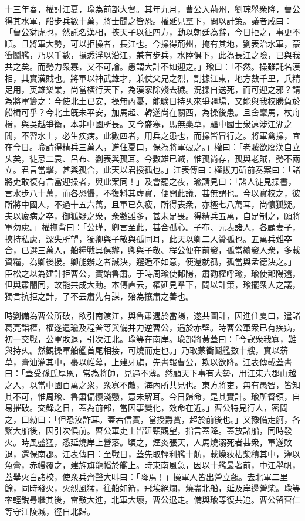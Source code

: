 \begin{pinyinscope}
十三年春，權討江夏，瑜為前部大督。其年九月，曹公入荊州，劉琮舉衆降，曹公得其水軍，船步兵數十萬，將士聞之皆恐。權延見羣下，問以計策。議者咸曰：「曹公豺虎也，然託名漢相，挾天子以征四方，動以朝廷為辭，今日拒之，事更不順。且將軍大勢，可以拒操者，長江也。今操得荊州，掩有其地，劉表治水軍，蒙衝鬬艦，乃以千數，操悉浮以沿江，兼有步兵，水陸俱下，此為長江之險，已與我共之矣。而勢力衆寡，又不可論。愚謂大計不如迎之。」瑜曰：「不然。操雖託名漢相，其實漢賊也。將軍以神武雄才，兼仗父兄之烈，割據江東，地方數千里，兵精足用，英雄樂業，尚當橫行天下，為漢家除殘去穢。況操自送死，而可迎之邪？請為將軍籌之：今使北土已安，操無內憂，能曠日持乆來爭疆場，又能與我校勝負於船楫可乎？今北土旣未平安，加馬超、韓遂尚在關西，為操後患。且舍鞌馬，杖舟楫，與吳越爭衡，本非中國所長。又今盛寒，馬無槀草，驅中國士衆遠涉江湖之閒，不習水土，必生疾病。此數四者，用兵之患也，而操皆冒行之。將軍禽操，宜在今日。瑜請得精兵三萬人，進住夏口，保為將軍破之。」權曰：「老賊欲廢漢自立乆矣，徒忌二袁、呂布、劉表與孤耳。今數雄已滅，惟孤尚存，孤與老賊，勢不兩立。君言當擊，甚與孤合，此天以君授孤也。」江表傳曰：權拔刀斫前奏案曰：「諸將吏敢復有言當迎操者，與此案同！」及會罷之夜，瑜請見曰：「諸人徒見操書，言水步八十萬，而各恐懾，不復料其虛實，便開此議，甚無謂也。今以實校之，彼所將中國人，不過十五六萬，且軍已久疲，所得表衆，亦極七八萬耳，尚懷狐疑。夫以疲病之卒，御狐疑之衆，衆數雖多，甚未足畏。得精兵五萬，自足制之，願將軍勿慮。」權撫背曰：「公瑾，卿言至此，甚合孤心。子布、元表諸人，各顧妻子，挾持私慮，深失所望，獨卿與子敬與孤同耳，此天以卿二人贊孤也。五萬兵難卒合，已選三萬人，船糧戰具俱辦，卿與子敬、程公便在前發，孤當續發人衆，多載資糧，為卿後援。卿能辦之者誠決，邂逅不如意，便還就孤，孤當與孟德決之。」臣松之以為建計拒曹公，實始魯肅。于時周瑜使鄱陽，肅勸權呼瑜，瑜使鄱陽還，但與肅闇同，故能共成大勳。本傳直云，權延見羣下，問以計策，瑜擺衆人之議，獨言抗拒之計，了不云肅先有謀，殆為攘肅之善也。

時劉備為曹公所破，欲引南渡江，與魯肅遇於當陽，遂共圖計，因進住夏口，遣諸葛亮詣權，權遂遣瑜及程普等與備并力逆曹公，遇於赤壁。時曹公軍衆已有疾病，初一交戰，公軍敗退，引次江北。瑜等在南岸。瑜部將黃蓋曰：「今寇衆我寡，難與持乆。然觀操軍船艦首尾相接，可燒而走也。」乃取蒙衝鬬艦數十艘，實以薪草，膏油灌其中，裹以帷幕，上建牙旗，先書報曹公，欺以欲降。江表傳載蓋書曰：「蓋受孫氏厚恩，常為將帥，見遇不薄。然顧天下事有大勢，用江東六郡山越之人，以當中國百萬之衆，衆寡不敵，海內所共見也。東方將吏，無有愚智，皆知其不可，惟周瑜、魯肅偏懷淺戇，意未解耳。今日歸命，是其實計。瑜所督領，自易摧破。交鋒之日，蓋為前部，當因事變化，效命在近。」曹公特見行人，密問之，口勑曰：「但恐汝詐耳。蓋若信實，當授爵賞，超於前後也。」又豫備走舸，各繫大船後，因引次俱前。曹公軍吏士皆延頸觀望，指言蓋降。蓋放諸船，同時發火。時風盛猛，悉延燒岸上營落。頃之，煙炎張天，人馬燒溺死者甚衆，軍遂敗退，還保南郡。江表傳曰：至戰日，蓋先取輕利艦十舫，載燥荻枯柴積其中，灌以魚膏，赤幔覆之，建旌旗龍幡於艦上。時東南風急，因以十艦最著前，中江舉帆，蓋舉火白諸校，使衆兵齊聲大叫曰：「降焉！」操軍人皆出營立觀。去北軍二里餘，同時發火，火烈風猛，往船如箭，飛埃絕爛，燒盡北船，延及岸邊營柴。瑜等率輕銳尋繼其後，雷鼓大進，北軍大壞，曹公退走。備與瑜等復共追。曹公留曹仁等守江陵城，徑自北歸。


\end{pinyinscope}
